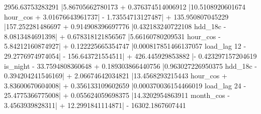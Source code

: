 2956.63753283291 \left|{5.86705662780173  + 0.376374514006912 \left|{10.5108920601674 hour_{cos} + 3.01676643961737}\right| - 1.73554713127487}\right| + 135.950807045229 \left|{157.252281486697  + 0.914908396697776 \left|{0.432183240722108 hdd_{18c} - 8.0813484691398}\right| + 0.678318121856567 \left|{5.66160780209531 hour_{cos} - 5.84212160874927}\right| + 0.122225665354747 \left|{0.000817851466137057 load_{lag 12} - 29.2776974974054}\right| - 156.643721554511}\right| + 426.445929853882 \left|{- 0.423297157204619 is_{night} - 33.7594808360648  + 0.189303866440756 \left|{0.963027226950375 hdd_{18c} - 0.394204241546169}\right| + 2.06674642034821 \left|{13.4568293215443 hour_{cos} + 3.83600670604008}\right| + 0.356133109602659 \left|{0.000370036154466019 load_{lag 24} - 25.4775366775008}\right| + 0.055624059698375 \left|{14.3202954863911 month_{cos} - 3.4563939828311}\right| + 12.2991841114871}\right| - 16302.1867607441
